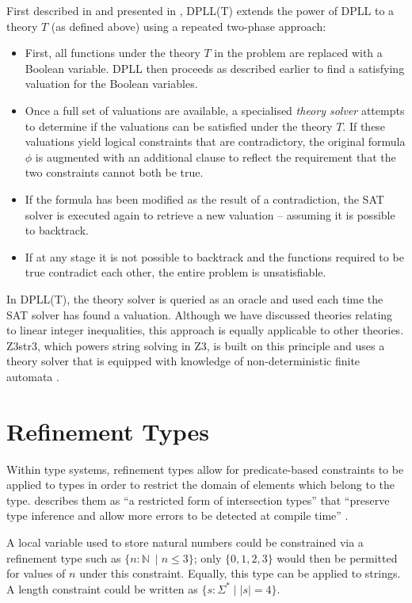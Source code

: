 \documentclass[a4paper,openany,12pt]{book}
\begin{document}
First described in \citet{ganzinger2004dpll} and presented in \citet{presdpllt}, DPLL(T) extends the power of DPLL to a theory $T$ (as defined above) using a repeated two-phase approach:

\begin{itemize}
	\item First, all functions under the theory $T$ in the problem are replaced with a Boolean variable. DPLL then proceeds as described earlier to find a satisfying valuation for the Boolean variables.
	\item Once a full set of valuations are available, a specialised \emph{theory solver} attempts to determine if the valuations can be satisfied under the theory $T$. If these valuations yield logical constraints that are contradictory, the original formula $\phi$ is augmented with an additional clause to reflect the requirement that the two constraints cannot both be true.
	\item If the formula has been modified as the result of a contradiction, the SAT solver is executed again to retrieve a new valuation -- assuming it is possible to backtrack.
	\item If at any stage it is not possible to backtrack and the functions required to be true contradict each other, the entire problem is unsatisfiable.
\end{itemize}

In DPLL(T), the theory solver is queried as an oracle and used each time the SAT solver has found a valuation. Although we have discussed theories relating to linear integer inequalities, this approach is equally applicable to other theories. Z3str3, which powers string solving in Z3, is built on this principle and uses a theory solver that is equipped with knowledge of non-deterministic finite automata \citep{berzish2017z3str3}.

\section{Refinement Types}

Within type systems, refinement types allow for predicate-based constraints to be applied to types in order to restrict the domain of elements which belong to the type. \citeauthor{benjaminpierce2002} describes them as ``a restricted form of intersection types'' that ``preserve type inference and allow more errors to be detected at compile time'' \citeyearpar{benjaminpierce2002}.

A local variable used to store natural numbers could be constrained via a refinement type such as $\{n: \mathbb{N}\ \mid n \leq 3\}$; only $\{0, 1, 2, 3\}$ would then be permitted for values of $n$ under this constraint. Equally, this type can be applied to strings. A length constraint could be written as $\{s : \Sigma^* \mid \left| s \right| = 4 \}$.
\end{document}
